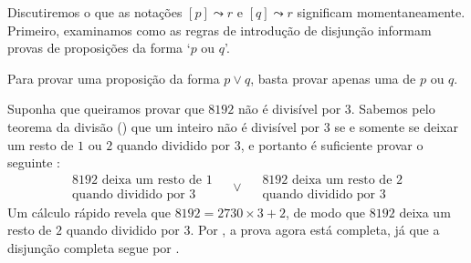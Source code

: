 Discutiremos o que as notações $[p] \leadsto r$ e $[q] \leadsto r$ significam momentaneamente. Primeiro, examinamos como as regras de introdução de disjunção informam provas de proposições da forma `$p$ ou $q$'.

\begin{strategy}
\label{strProvingDisjunctionsDirect}
Para provar uma proposição da forma $p \vee q$, basta provar apenas uma de $p$ ou $q$.
\end{strategy}

\begin{example}
Suponha que queiramos provar que $8192$ não é divisível por $3$. Sabemos pelo teorema da divisão () que um inteiro não é divisível por $3$ se e somente se deixar um resto de $1$ ou $2$ quando dividido por $3$, e portanto é suficiente provar o seguinte :
\[
\begin{matrix} 8192 \text{ deixa um resto de } 1 \\ \text{quando dividido por } 3 \end{matrix}
\quad \vee \quad
\begin{matrix} 8192 \text{ deixa um resto de } 2 \\
\text{quando dividido por } 3 \end{matrix}
\]
Um cálculo rápido revela que $8192 = 2730 \times 3 + 2$, de modo que $8192$ deixa um resto de $2$ quando dividido por $3$. Por , a prova agora está completa, já que a disjunção completa segue por .
\end{example}

